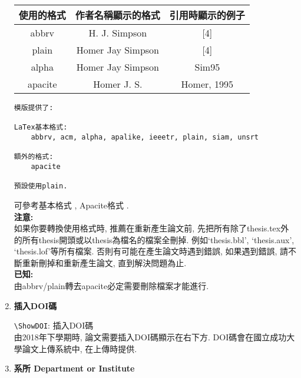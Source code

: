 \begin{enumerate}
{  \InsertTable
    {
        \begin{tabular}{|c|c|c|}
        \hline
        使用的格式   & 作者名稱顯示的格式         & 引用時顯示的例子    \\ \hline
        abbrv   & H. J. Simpson     & {[}4{]}     \\ \hline
        plain   & Homer Jay Simpson & {[}4{]}     \\ \hline
        alpha   & Homer Jay Simpson & Sim95       \\ \hline
        apacite & Homer J. S.       & Homer, 1995 \\ \hline
        \end{tabular}
    }

    \begin{DescriptionFrame}
    \begin{verbatim}
模版提供了:

LaTex基本格式:
    abbrv, acm, alpha, apalike, ieeetr, plain, siam, unsrt

額外的格式:
    apacite

預設使用plain.
    \end{verbatim}
    \end{DescriptionFrame}

   可參考基本格式 , Apacite格式 .\\

 \textbf{注意:}\\
如果你要轉換使用格式時, 推薦在重新產生論文前, 先把所有除了thesis.tex外的所有thesis開頭或以thesis為檔名的檔案全刪掉. 例如`thesis.bbl', `thesis.aux', `thesis.lof'等所有檔案.  否則有可能在產生論文時遇到錯誤, 如果遇到錯誤, 請不斷重新刪掉和重新產生論文, 直到解決問題為止.\\

 \textbf{已知:}\\
由abbrv/plain轉去apacite必定需要刪除檔案才能進行.
  } %

  \newpage
  \item
  {
    \textbf{插入DOI碼}

    \verb|\ShowDOI|:  插入DOI碼\\
    由2018年下學期時, 論文需要插入DOI碼顯示在右下方. DOI碼會在國立成功大學論文上傳系統中, 在上傳時提供.
  } %

  \newpage
  \item
  {
    \textbf{系所 Department or Institute}

}
\end{enumerate}

